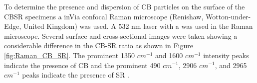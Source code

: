 To determine the presence and dispersion of CB particles on the surface of the CBSR specimens a inVia confocal Raman microscope (Renishaw, Wotton-under-Edge, United Kingdom) was used. A 532 nm laser with a was used in the Raman microscope. Several surface and cross-sectional images were taken showing a considerable difference in the CB-SR ratio as shown in Figure \ref{fig:Raman_CB_SR}. The prominent 1350 $cm^{-1}$ and 1600 $cm^{-1}$ intensity peaks indicate the presence of CB and the prominent 490 $cm^{-1}$, 2906 $cm^{-1}$, and 2965 $cm^{-1}$ peaks indicate the presence of SR \cite{Pawlyta2015,RamanLife2024}. 
\begin{figure}[H]
	\centering
    \begin{minipage}[t]{.49\textwidth}
    	\centering
    	\vspace{1cm}
		\vfill
		\vspace{0.3cm}
\end{minipage}
\end{figure}
